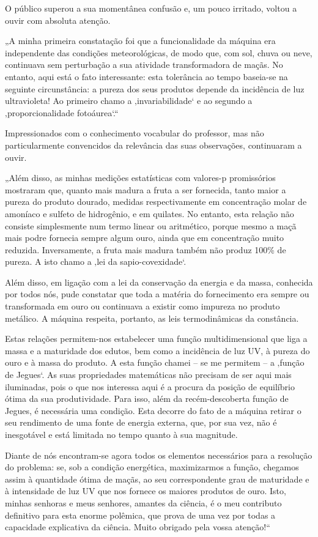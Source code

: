 O público superou a sua momentânea confusão e, um pouco
irritado, voltou a ouvir com absoluta atenção.

„A minha primeira constatação foi que a funcionalidade da
máquina era independente das condições meteorológicas, de modo
que, com sol, chuva ou neve, continuava sem perturbação a sua
atividade transformadora de maçãs. No entanto, aqui está o fato
interessante: esta tolerância ao tempo baseia-se na seguinte
circunstância: a pureza dos seus produtos depende da
incidência de luz ultravioleta! Ao primeiro chamo a
‚invariabilidade‘ e ao segundo a ‚proporcionalidade
fotoáurea‘.“

Impressionados com o conhecimento vocabular do professor, mas
não particularmente convencidos da relevância das suas
observações, continuaram a ouvir.

„Além disso, as minhas medições estatísticas com valores-p
promissórios mostraram que, quanto mais madura a fruta a ser
fornecida, tanto maior a pureza do produto dourado, medidas
respectivamente em concentração molar de amoníaco e sulfeto de
hidrogênio, e em quilates. No entanto, esta relação não
consiste simplesmente num termo linear ou aritmético, porque
mesmo a maçã mais podre fornecia sempre algum ouro, ainda que em
concentração muito reduzida. Inversamente, a fruta mais madura
também não produz 100\% de pureza. A isto chamo a ‚lei da
sapio-covexidade‘.

Além disso, em ligação com a lei da conservação da energia e da
massa, conhecida por todos nós, pude constatar que toda a
matéria do fornecimento era sempre ou transformada em ouro ou
continuava a existir como impureza no produto metálico. A
máquina respeita, portanto, as leis termodinâmicas da
constância.

Estas relações permitem-nos estabelecer uma função
multidimensional que liga a massa e a maturidade dos edutos,
bem como a incidência de luz UV, à pureza do ouro e à massa do
produto. A esta função chamei – se me permitem – a ‚função de
Jegues‘. As suas propriedades matemáticas não precisam de ser
aqui mais iluminadas, pois o que nos interessa aqui é a procura
da posição de equilíbrio ótima da sua produtividade. Para isso,
além da recém-descoberta função de Jegues, é necessária uma
condição. Esta decorre do fato de a máquina retirar o seu
rendimento de uma fonte de energia externa, que, por sua vez,
não é inesgotável e está limitada no tempo quanto à sua
magnitude.

Diante de nós encontram-se agora todos os elementos necessários
para a resolução do problema: se, sob a condição energética,
maximizarmos a função, chegamos assim à quantidade ótima de
maçãs, ao seu correspondente grau de maturidade e à intensidade
de luz UV que nos fornece os maiores produtos de ouro. Isto,
minhas senhoras e meus senhores, amantes da ciência, é o meu
contributo definitivo para esta enorme polêmica, que prova de
uma vez por todas a capacidade explicativa da ciência. Muito
obrigado pela vossa atenção!“

